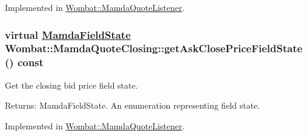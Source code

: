 Implemented in \hyperlink{classWombat_1_1MamdaQuoteListener_1c6e2936fa8677578ee30e6a50ee29bf}{Wombat::Mamda\-Quote\-Listener}.\hypertarget{classWombat_1_1MamdaQuoteClosing_d6c65af52adcf386c114c5b757338072}{
\subsubsection[getAskClosePriceFieldState]{\setlength{\rightskip}{0pt plus 5cm}virtual \hyperlink{namespaceWombat_93aac974f2ab713554fd12a1fa3b7d2a}{Mamda\-Field\-State} Wombat::Mamda\-Quote\-Closing::get\-Ask\-Close\-Price\-Field\-State () const}}
\label{classWombat_1_1MamdaQuoteClosing_d6c65af52adcf386c114c5b757338072}


Get the closing bid price field state. 

\begin{Desc}
\item[Returns:]Mamda\-Field\-State. An enumeration representing field state. \end{Desc}


Implemented in \hyperlink{classWombat_1_1MamdaQuoteListener_a6dcf6a065420d6fdf9d5e07093ed603}{Wombat::Mamda\-Quote\-Listener}.